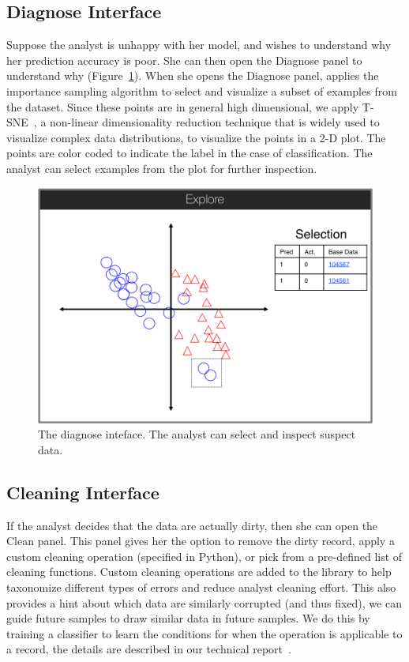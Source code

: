 \subsection{Diagnose Interface}
Suppose the analyst is unhappy with her model, and wishes to understand why her prediction accuracy is poor.
She can then open the \textsf{Diagnose} panel to understand why (Figure~\ref{diag}).
When she opens the \textsf{Diagnose} panel, \sys applies the importance sampling algorithm to select and visualize a subset of examples from the dataset.
Since these points are in general high dimensional, we apply T-SNE~\cite{van2008visualizing},
a non-linear dimensionality reduction technique that is widely used to visualize complex data distributions,
to visualize the points in a 2-D plot.
The points are color coded to indicate the label in the case of classification.
The analyst can select examples from the plot for further inspection.

\begin{figure}[t]
\centering
 \includegraphics[width=0.5\columnwidth]{figs/interface3.png}
 \caption{The diagnose inteface. The analyst can select and inspect suspect data. \label{diag}}
\end{figure}

\subsection{Cleaning Interface}
If the analyst decides that the data are actually dirty, then she can open the \textsf{Clean} panel.
This panel gives her the option to remove the dirty record, apply a custom cleaning operation (specified in Python), or pick from a pre-defined list of cleaning functions.
Custom cleaning operations are added to the library to help taxonomize different types of errors and reduce analyst cleaning effort.
This also provides a hint about which data are similarly corrupted (and thus fixed), we can guide future samples to draw similar data in future samples.
We do this by training a classifier to learn the conditions for when the operation is applicable to a record, the details are described in our technical report~\cite{activecleanarxiv}.

